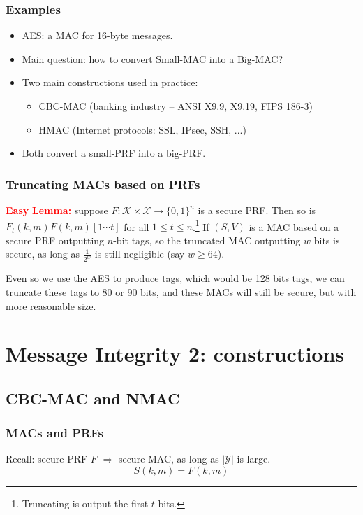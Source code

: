 \documentclass[12pt]{book}
\newcommand{\Lemma}{\textcolor{red}{\textbf{Lemma:}} }
\begin{document}
\subsubsection{Examples}
\begin{itemize}
	\item AES: a MAC for 16-byte messages.
	\item Main question: how to convert Small-MAC into a Big-MAC?
	\item Two main constructions used in practice:
	\begin{itemize}
		\item CBC-MAC (banking industry -- ANSI X9.9, X9.19, FIPS 186-3)
		\item HMAC (Internet protocols: SSL, IPsec, SSH, ...)
	\end{itemize}
	\item Both convert a small-PRF into a big-PRF.
\end{itemize}

\subsubsection{Truncating MACs based on PRFs}
\textcolor{red}{\textbf{Easy}} \Lemma suppose $F:\mathcal{K}\times\mathcal{X}\rightarrow\{0,1\}^{n}$ is a secure PRF. Then so is $F_{t}(k,m)F(k,m)[1\cdots t]$ for all $1\leq t\leq n$.\footnote{Truncating is output the first $t$ bits.} If $(S,V)$ is a MAC based on a secure PRF outputting $n$-bit tags, so the truncated MAC outputting $w$ bits is secure, as long as $\frac{1}{2^{w}}$ is still negligible (say $w\geq 64$).

Even so we use the AES to produce tags, which would be 128 bits tags, we can truncate these tags to 80 or 90 bits, and these MACs will still be secure, but with more reasonable size.

\newpage
\section{Message Integrity 2: constructions}
\subsection{CBC-MAC and NMAC}
\subsubsection{MACs and PRFs}
Recall: secure PRF $F$ $\Rightarrow$ secure MAC, as long as $|\mathcal{Y}|$ is large.
$$S(k,m)=F(k,m)$$
\end{document}
